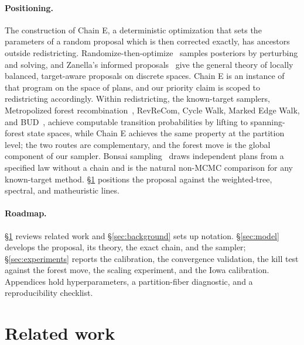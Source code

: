\documentclass[11pt]{article}
\begin{document}
\paragraph{Positioning.} The construction of Chain E, a deterministic
optimization that sets the parameters of a random proposal which is
then corrected exactly, has ancestors outside redistricting.
Randomize-then-optimize~\cite{bardsley2014randomize} samples
posteriors by perturbing and solving, and Zanella's informed
proposals~\cite{zanella2020informed} give the general theory of
locally balanced, target-aware proposals on discrete spaces. Chain E
is an instance of that program on the space of plans, and our
priority claim is scoped to redistricting accordingly. Within
redistricting, the known-target samplers, Metropolized forest
recombination~\cite{autry2023metropolized}, RevReCom, Cycle Walk,
Marked Edge Walk, and
BUD~\cite{cannon2022spanning,deford2025cycle,mcwhorter2025marked,
akitaya2026bud}, achieve computable transition probabilities by
lifting to spanning-forest state spaces, while Chain E achieves the
same property at the partition level; the two routes are
complementary, and the forest move is the global component of our
sampler. Bonsai sampling~\cite{clelland2026bonsai} draws independent
plans from a specified law without a chain and is the natural non-MCMC
comparison for any known-target method. \S\ref{sec:related} positions
the proposal against the weighted-tree, spectral, and matheuristic
lines.

\paragraph{Roadmap.}\label{sec:intro-roadmap}
\S\ref{sec:related} reviews related work and \S\ref{sec:background}
sets up notation. \S\ref{sec:model} develops the proposal, its
theory, the exact chain, and the sampler; \S\ref{sec:experiments}
reports the calibration, the convergence validation, the kill test
against the forest move, the scaling experiment, and the Iowa
calibration. Appendices hold hyperparameters, a partition-fiber
diagnostic, and a reproducibility checklist.

\section{Related work}\label{sec:related}
\end{document}
